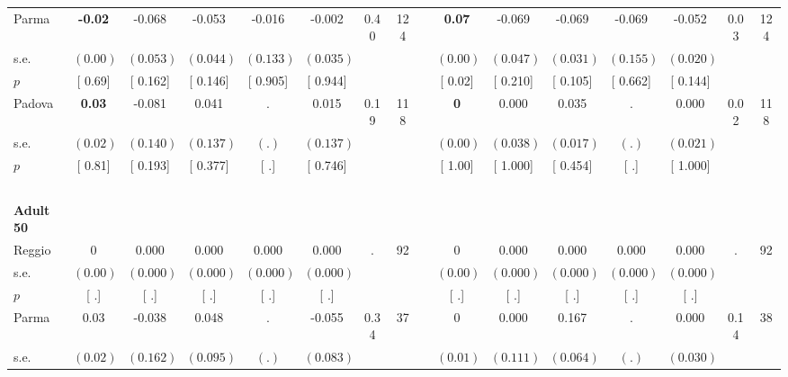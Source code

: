 \begin{longtable}{L{8em} c c c c c c c p{1em} c c c c c c c}
\quad \quad \quad Parma& \textbf{    -0.02} &    -0.068 &    -0.053 &    -0.016 &    -0.002 &      0.40 &       124 & & \textbf{     0.07} &    -0.069 &    -0.069 &    -0.069 &    -0.052 &      0.03 &       124  \\*
\quad \quad \quad \quad s.e.& $ (     0.00)$ & $ (    0.053)$ & $ (    0.044)$ & $ (    0.133)$ & $ (    0.035)$ & & & & $ (     0.00)$ & $ (    0.047)$ & $ (    0.031)$ & $ (    0.155)$ & $ (    0.020)$ & &  \\*
\quad \quad \quad \quad $ p$ & [     0.69] & [    0.162] & [    0.146] & [    0.905] & [    0.944] & & & & [     0.02] & [    0.210] & [    0.105] & [    0.662] & [    0.144] & &  \\[1em]
\quad \quad \quad Padova& \textbf{     0.03} &    -0.081 &     0.041 &         . &     0.015 &      0.19 &       118 & & \textbf{0} &     0.000 &     0.035 &         . &     0.000 &      0.02 &       118  \\*
\quad \quad \quad \quad s.e.& $ (     0.02)$ & $ (    0.140)$ & $ (    0.137)$ & $ (        .)$ & $ (    0.137)$ & & & & $ (     0.00)$ & $ (    0.038)$ & $ (    0.017)$ & $ (        .)$ & $ (    0.021)$ & &  \\*
\quad \quad \quad \quad $ p$ & [     0.81] & [    0.193] & [    0.377] & [        .] & [    0.746] & & & & [     1.00] & [    1.000] & [    0.454] & [        .] & [    1.000] & &  \\[1em]
~\\[1em]
\quad \quad \textbf{Adult 50} & & & & & & & & & & & & & & & \\* 
\quad \quad \quad Reggio& 0 &     0.000 &     0.000 &     0.000 &     0.000 &         . &        92 & & 0 &     0.000 &     0.000 &     0.000 &     0.000 &         . &        92  \\*
\quad \quad \quad \quad s.e.& $ (     0.00)$ & $ (    0.000)$ & $ (    0.000)$ & $ (    0.000)$ & $ (    0.000)$ & & & & $ (     0.00)$ & $ (    0.000)$ & $ (    0.000)$ & $ (    0.000)$ & $ (    0.000)$ & &  \\*
\quad \quad \quad \quad $ p$ & [        .] & [        .] & [        .] & [        .] & [        .] & & & & [        .] & [        .] & [        .] & [        .] & [        .] & &  \\[1em]
\quad \quad \quad Parma& 0.03 &    -0.038 &     0.048 &         . &    -0.055 &      0.34 &        37 & & 0 &     0.000 &     0.167 &         . &     0.000 &      0.14 &        38  \\*
\quad \quad \quad \quad s.e.& $ (     0.02)$ & $ (    0.162)$ & $ (    0.095)$ & $ (        .)$ & $ (    0.083)$ & & & & $ (     0.01)$ & $ (    0.111)$ & $ (    0.064)$ & $ (        .)$ & $ (    0.030)$ & &  \\*

\end{longtable}
